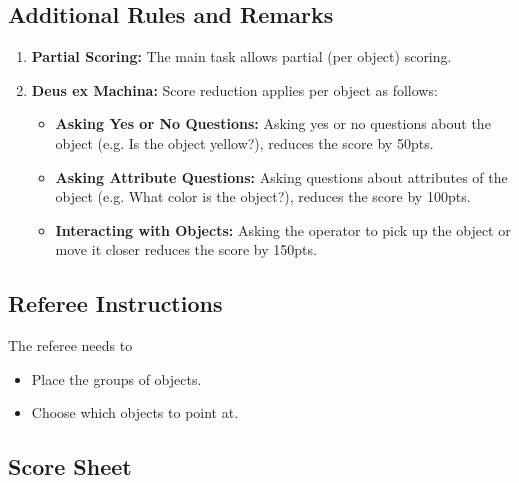 \subsection*{Additional Rules and Remarks}
\begin{enumerate}[nosep]
	\item \textbf{Partial Scoring:} The main task allows partial (per object) scoring.
	
	\item \textbf{Deus ex Machina:} Score reduction applies per object as follows:
	\begin{itemize}[nosep]
		\item \textbf{Asking Yes or No Questions:} Asking yes or no questions about the object (e.g. Is the object yellow?), reduces the score by 50pts.
		\item \textbf{Asking Attribute Questions:} Asking questions about attributes of the object (e.g. What color is the object?), reduces the score by 100pts.
		\item \textbf{Interacting with Objects:} Asking the operator to pick up the object or move it closer reduces the score by 150pts.
	\end{itemize}
\end{enumerate}

\newpage

\subsection*{Referee Instructions}

The referee needs to
\begin{itemize}[nosep]
	\item Place the groups of objects.
	\item Choose which objects to point at.
\end{itemize}

\subsection*{Score Sheet}


